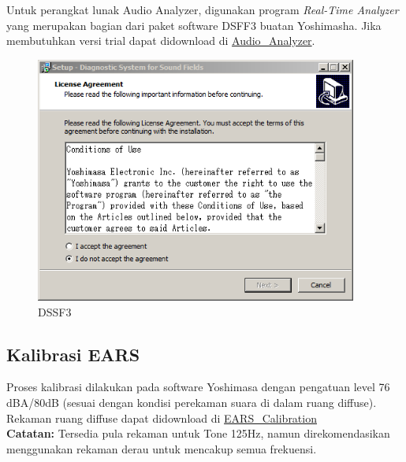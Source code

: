 \documentclass[12pt]{book}
\begin{document}
	Untuk perangkat lunak Audio Analyzer, digunakan program \textit{Real-Time Analyzer}
	yang merupakan bagian dari paket software DSFF3 buatan Yoshimasha.
	Jika membutuhkan versi trial dapat didownload di \href{https://drive.google.com/drive/folders/1Z4cc4C_vb7BwU_MHDFyJTTVzQO7n7AHP?usp=share_link}{Audio\_Analyzer}.

	\begin{figure}[!ht]
		\centering
		\includegraphics[width=300pt]{images/dssf3/dssf3}
		\caption{DSSF3}
	\end{figure}

	\subsection{Kalibrasi EARS}

	Proses kalibrasi dilakukan pada software Yoshimasa dengan pengatuan level 76 dBA/80dB (sesuai dengan kondisi perekaman suara di dalam ruang diffuse).
	Rekaman ruang diffuse dapat didownload di \href{https://drive.google.com/drive/folders/1FfFU9WPwoisH7j-oDqF8G0ruZmY0lxM_?usp=share_link}{EARS\_Calibration}\\

	\textbf{Catatan:} Tersedia pula rekaman untuk Tone 125Hz, namun direkomendasikan menggunakan rekaman derau untuk mencakup semua frekuensi.\\
\end{document}

